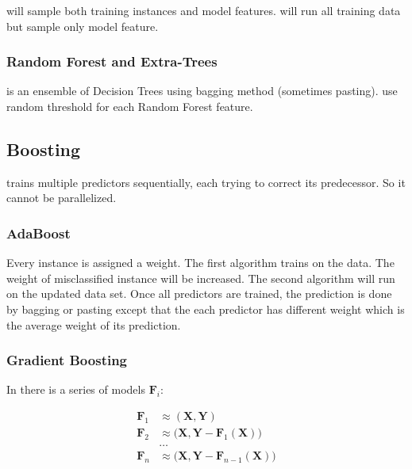 will sample both training instances and model features.  will run all training data but sample only model feature.


\subsubsection{Random Forest and Extra-Trees}

 is an ensemble of Decision Trees using bagging method (sometimes pasting).  use random threshold for each Random Forest feature.


\subsection{Boosting}

 trains multiple predictors sequentially, each trying to correct its predecessor. So it cannot be parallelized.


\subsubsection{AdaBoost}

Every instance is assigned a weight. The first algorithm trains on the data. The weight of misclassified instance will be increased. The second algorithm will run on the updated data set. Once all predictors are trained, the prediction is done by bagging or pasting except that the each predictor has different weight which is the average weight of its prediction.


\subsubsection{Gradient Boosting}

In  there is a series of models $\mathbf{F}_i$:

\begin{equation}
	\begin{aligned}
		\mathbf{F}_1 &\approx (\mathbf{X},\mathbf{Y}) \\
		\mathbf{F}_2 &\approx \Big(\mathbf{X},\mathbf{Y} - \mathbf{F}_1 (\mathbf{X}) \Big ) \\
		&\dots \\
		\mathbf{F}_n &\approx \Big(\mathbf{X},\mathbf{Y} - \mathbf{F}_{n-1} (\mathbf{X}) \Big )
	\end{aligned}
\end{equation}


